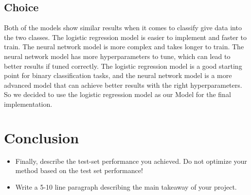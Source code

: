 \documentclass[a4, 10 pt, conference]{ieeeconf}  %
\begin{document}
\subsection{Choice}
Both of the models show similar results when it comes to classify give data into the two classes. The logistic regression model is easier to implement and faster to train. The neural network model is more complex and takes longer to train. The neural network model has more hyperparameters to tune, which can lead to better results if tuned correctly.
The logistic regression model is a good starting point for binary classification tasks, and the neural network model is a more advanced model that can achieve better results with the right hyperparameters. So we decided to use the logistic regression model as our Model for the final implementation.

\section{Conclusion}
\label{sec:con}

{\color{blue}

  \begin{itemize}
    \item Finally, describe the test-set performance you achieved. Do not
          optimize your method based on the test set performance!
    \item Write a 5-10 line paragraph describing the main takeaway of your project.
  \end{itemize}

}
\end{document}
